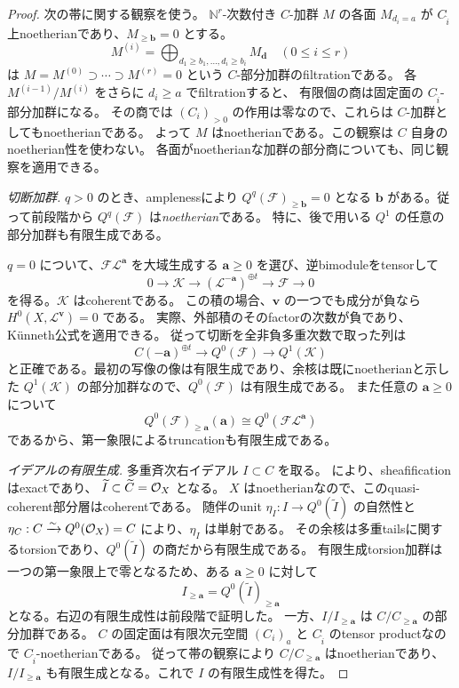 \begin{proof}
 次の帯に関する観察を使う。
 \(\mathbb N^r\)-次数付き \(C\)-加群 \(M\) の各面 \(M_{d_i=a}\) が
 \(C_{\widehat i}\) 上noetherianであり、\(M_{\ge\mathbf b}=0\) とする。
 \[
 M^{(i)}=\bigoplus_{d_1\ge b_1,\ldots,d_i\ge b_i}M_{\mathbf d}
 \quad(0\le i\le r)
 \]
 は \(M=M^{(0)}\supset\cdots\supset M^{(r)}=0\) という \(C\)-部分加群のfiltrationである。
 各 \(M^{(i-1)}/M^{(i)}\) をさらに \(d_i\ge a\) でfiltrationすると、
 有限個の商は固定面の \(C_{\widehat i}\)-部分加群になる。
 その商では \((C_i)_{>0}\) の作用は零なので、これらは \(C\)-加群としてもnoetherianである。
 よって \(M\) はnoetherianである。この観察は \(C\) 自身のnoetherian性を使わない。
 各面がnoetherianな加群の部分商についても、同じ観察を適用できる。

 \emph{切断加群.}
 \(q>0\) のとき、amplenessにより \(Q^q(\mathcal F)_{\ge\mathbf b}=0\) となる
 \(\mathbf b\) がある。従って前段階から
 \(Q^q(\mathcal F)\) は\emph{noetherian}である。
 特に、後で用いる \(Q^1\) の任意の部分加群も有限生成である。

 \(q=0\) について、\(\mathcal F\mathcal L^{\mathbf a}\) を大域生成する
 \(\mathbf a\ge0\) を選び、逆bimoduleをtensorして
 \[
 0\longrightarrow\mathcal K\longrightarrow
       (\mathcal L^{-\mathbf a})^{\oplus t}
       \longrightarrow\mathcal F\longrightarrow0
 \]
 を得る。\(\mathcal K\) はcoherentである。
 この積の場合、\(\mathbf v\) の一つでも成分が負なら
 \(H^0(X,\mathcal L^{\mathbf v})=0\) である。
 実際、外部積のそのfactorの次数が負であり、K\"unneth公式を適用できる。
 従って切断を全非負多重次数で取った列は
 \[
 C(-\mathbf a)^{\oplus t}\longrightarrow Q^0(\mathcal F)
       \longrightarrow Q^1(\mathcal K)
 \]
 と正確である。最初の写像の像は有限生成であり、余核は既にnoetherianと示した
 \(Q^1(\mathcal K)\) の部分加群なので、\(Q^0(\mathcal F)\) は有限生成である。
 また任意の \(\mathbf a\ge0\) について
 \[
 Q^0(\mathcal F)_{\ge\mathbf a}(\mathbf a)
 \cong Q^0(\mathcal F\mathcal L^{\mathbf a})
 \]
 であるから、第一象限によるtruncationも有限生成である。

 \emph{イデアルの有限生成.}
 多重斉次右イデアル \(I\subset C\) を取る。
 \cite[Theorem 3.4]{ChanMulti} により、sheafificationはexactであり、
 \(\widetilde I\subset\widetilde C=\mathcal O_X\) となる。
 \(X\) はnoetherianなので、このquasi-coherent部分層はcoherentである。
 随伴のunit \(\eta_I:I\to Q^0(\widetilde I)\) の自然性と
 \(\eta_C:C\xrightarrow{\sim}Q^0(\mathcal O_X)=C\) により、\(\eta_I\) は単射である。
 その余核は多重tailsに関するtorsionであり、\(Q^0(\widetilde I)\) の商だから有限生成である。
 有限生成torsion加群は一つの第一象限上で零となるため、ある \(\mathbf a\ge0\) に対して
 \[
 I_{\ge\mathbf a}=Q^0(\widetilde I)_{\ge\mathbf a}
 \]
 となる。右辺の有限生成性は前段階で証明した。
 一方、\(I/I_{\ge\mathbf a}\) は \(C/C_{\ge\mathbf a}\) の部分加群である。
 \(C\) の固定面は有限次元空間 \((C_i)_a\) と \(C_{\widehat i}\) のtensor productなので
 \(C_{\widehat i}\)-noetherianである。
 従って帯の観察により \(C/C_{\ge\mathbf a}\) はnoetherianであり、
 \(I/I_{\ge\mathbf a}\) も有限生成となる。これで \(I\) の有限生成性を得た。


\end{proof}

